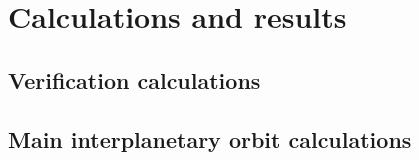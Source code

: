 \chapter{Calculations and results}

\section{Verification calculations}

\section{Main interplanetary orbit calculations}